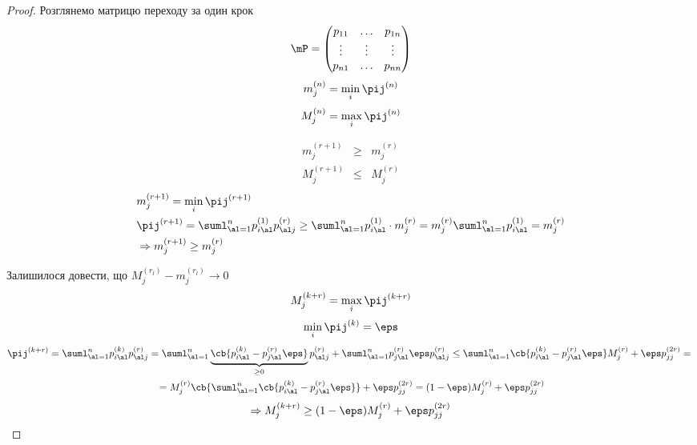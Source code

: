 \begin{proof}
Розглянемо матрицю переходу за один крок
\begin{equation}
\mP = \begin{pmatrix}
p_{11} & \ldots & p_{1n} \\
\vdots & \vdots & \vdots\\
p_{n1} & \ldots &p_{nn}
\end{pmatrix}
\end{equation}
\begin{equation}
m_j^{(n)} = \min\limits_i \pij^{(n)}
\end{equation}
\begin{equation}
M_j^{(n)} = \max\limits_i\pij^{(n)}
\end{equation}
\begin{tver}
\begin{eqnarray}
m_j^{(r+1)} &\geq& m_j^{(r)}\\
M_j^{(r+1)} &\leq& M_j^{(r)}
\end{eqnarray}
\begin{eqnarray}
&m_j^{(r+1)} = \min\limits_i \pij^{(r+1)}\\
&\pij^{(r+1)} = \suml_{\al=1}^n p_{i\al}^{(1)}p_{\al j}^{(r)} \geq \suml_{\al=1}^n p_{i\al}^{(1)} \cdot m_j^{(r)} = m_j^{(r)} \suml_{\al=1}^n p_{i\al}^{(1)} = m_j^{(r)}\\
&\Rightarrow m_j^{(r+1)} \geq m_j^{(r)}
\end{eqnarray}
\end{tver}
Залишилося довести, що $M_j^{(r_l)} - m_j^{(r_l)}\to 0$\\
\begin{equation}
M_j^{(k+r)} = \max\limits_i \pij^{(k+r)}
\end{equation}
\begin{equation}
\min\limits_i \pij^{(k)} = \eps
\end{equation}
\begin{multline}
\pij^{(k+r)} = \suml_{\al=1}^n p_{i\al}^{(k)} p_{\al j}^{(r)} = \suml_{\al=1}^n \underbrace{\cb{p_{i\al}^{(k)} -p_{j\al}^{(r)}\eps}}_{\geq 0} p_{\al j}^{(r)} + \suml_{\al=1}^n p_{j\al}^{(r)} \eps p_{\al j}^{(r)} \leq \suml_{\al=1}^n \cb{p_{i\al}^{(k)} - p_{j\al}^{(r)}\eps}M_j^{(r)} + \eps p_{jj}^{(2r)} = {} \\ {} = M_j^{(r)} \cb{\suml_{\al=1}^n \cb{p_{i\al}^{(k)} - p_{j\al}^{(r)}\eps}} + \eps p_{jj}^{(2r)} = (1-\eps) M_j^{(r)} +\eps p_{jj}^{(2r)}
\end{multline}
\begin{equation}
\Rightarrow M_j^{(k+r)} \geq (1-\eps) M_j^{(r)} +\eps p_{jj}^{(2r)}

\end{equation}
\end{proof}
